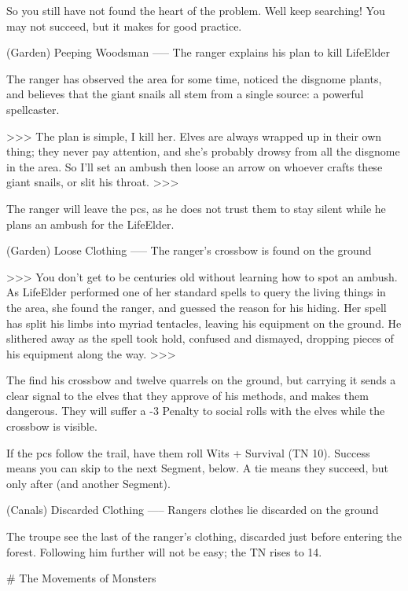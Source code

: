 \begin{speechtext}
  So you still have not found the heart of the problem.
  Well keep searching!
  You may not succeed, but it makes for good practice.
\end{speechtext}

(Garden) Peeping Woodsman
-----
{The ranger explains his plan to kill LifeElder}

The ranger has observed the area for some time, noticed the disgnome plants, and believes that the giant snails all stem from a single source: a powerful spellcaster.

>>>
The plan is simple, I kill her.
Elves are always wrapped up in their own thing; they never pay attention, and she's probably drowsy from all the disgnome in the area.
So I'll set an ambush then loose an arrow on whoever crafts these giant snails, or slit his throat.
>>>

The ranger will leave the \glspl{pc}, as he does not trust them to stay silent while he plans an ambush for the LifeElder.

(Garden) Loose Clothing
-----
{The ranger's crossbow is found on the ground}

>>>
You don't get to be centuries old without learning how to spot an ambush.
As LifeElder performed one of her standard spells to query the living things in the area, she found the ranger, and guessed the reason for his hiding.
Her spell has split his limbs into myriad tentacles, leaving his equipment on the ground.
He slithered away as the spell took hold, confused and dismayed, dropping pieces of his equipment along the way.
>>>

The find his crossbow and twelve quarrels on the ground, but carrying it sends a clear signal to the elves that they approve of his methods, and makes them dangerous.
They will suffer a -3 Penalty to social rolls with the elves while the crossbow is visible.

If the \glspl{pc} follow the trail, have them roll Wits + Survival (TN 10).
Success means you can skip to the next Segment, below.
A tie means they succeed, but only after  (and another Segment).

(Canals) Discarded Clothing
-----
{Rangers clothes lie discarded on the ground}

The troupe see the last of the ranger's clothing, discarded just before entering the forest.
Following him further will not be easy; the TN rises to 14.

# The Movements of Monsters

